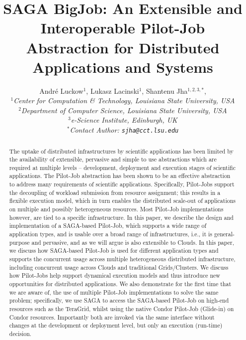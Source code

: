 \documentclass[conference,final]{IEEEtran}
\title{SAGA BigJob: An Extensible and Interoperable Pilot-Job
  Abstraction for Distributed Applications and Systems}
\author{
Andr\'e Luckow$^{1}$, Lukasz Lacinski$^{1}$,   Shantenu Jha$^{1,2,3,*}$,\\
  \small{\emph{$^{1}$Center for Computation \& Technology, Louisiana State University, USA}}\\
  \small{\emph{$^{2}$Department of Computer Science, Louisiana State University, USA}}\\
  \small{\emph{$^{3}$e-Science Institute, Edinburgh, UK}}\\
  \small{\emph{$^{*}$Contact Author: \texttt{sjha@cct.lsu.edu}}}\\
}
\newcommand{\alnote}[1]{ {\textcolor{blue} { ***AL: #1 }}}
\newcommand{\jhanote}[1]{ {\textcolor{red} { ***SJ: #1 }}}
\newcommand{\alnote}[1]{}
\newcommand{\jhanote}[1]{}
\begin{document}
 

\maketitle    

\begin{abstract}
  The uptake of distributed infrastructures by scientific applications
  has been limited by the availability of extensible, pervasive and
  simple to use abstractions which are required at multiple levels --
  development, deployment and execution stages of scientific
  applications. The Pilot-Job abstraction has been shown to be an
  effective abstraction to address many requirements of scientific
  applications.  Specifically, Pilot-Jobs support the decoupling of
  workload submission from resource assignment; this results in a
  flexible execution model, which in turn enables the distributed
  scale-out of applications on multiple and possibly heterogeneous
  resources.  Most Pilot-Job implementations however, are tied to a
  specific infrastructure. In this paper, we describe the design and
  implementation of a SAGA-based Pilot-Job, which supports a wide
  range of application types, and is usable over a broad range of
  infrastructures, i.e., it is general-purpose and pervasive, and as
  we will argue is also extensible to Clouds.  In this paper, we
  discuss how SAGA-based Pilot-Job is used for different application
  types and supports the concurrent usage across multiple
  heterogeneous distributed infrastructure, including concurrent usage
  across Clouds and traditional Grids/Clusters.  %
  We discuss how Pilot-Jobs help support dynamical execution models
  and thus introduce new opportunities for distributed applications.
  We also demonstrate for the first time that we are aware of, the use
  of multiple Pilot-Job implementations to solve the same problem;
  specifically, we use SAGA to access the SAGA-based Pilot-Job on
  high-end resources such as the TeraGrid, whilst using the native
  Condor Pilot-Job (Glide-in) on Condor resources. Importantly both
  are invoked via the same interface without changes at the
  development or deployment level, but only an execution (run-time)
  decision.
\end{abstract}
\end{document}
